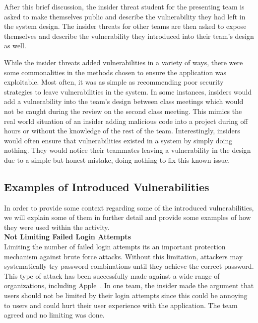\documentclass[conference]{IEEEtran}
\begin{document}
After this brief discussion, the insider threat student for the presenting team is asked to make themselves public and describe the vulnerability they had left in the system design. The insider threats for other teams are then asked to expose themselves and describe the vulnerability they introduced into their team's design as well.

While the insider threats added vulnerabilities in a variety of ways, there were some commonalities in the methods chosen to ensure the application was exploitable. Most often, it was as simple as recommending poor security strategies to leave vulnerabilities in the system. In some instances, insiders would add a vulnerability into the team's design between class meetings which would not be caught during the review on the second class meeting. This mimics the real world situation of an insider adding malicious code into a project during off hours or without the knowledge of the rest of the team. Interestingly, insiders would often ensure that vulnerabilities existed in a system by simply doing nothing. They would notice their teammates leaving a vulnerability in the design due to a simple but honest mistake, doing nothing to fix this known issue.





\subsection{Examples of Introduced Vulnerabilities}



In order to provide some context regarding some of the introduced vulnerabilities, we will explain some of them in further detail and provide some examples of how they were used within the activity. \\

\textbf{Not Limiting Failed Login Attempts}\\
Limiting the number of failed login attempts its an important protection mechanism against brute force attacks. Without this limitation, attackers may systematically try password combinations until they achieve the correct password. This type of attack has been successfully made against a wide range of organizations, including Apple~\cite{apple_bruteforce_url}. In one team, the insider made the argument that users should not be limited by their login attempts since this could be annoying to users and could hurt their user experience with the application. The team agreed and no limiting was done. \\
\end{document}
